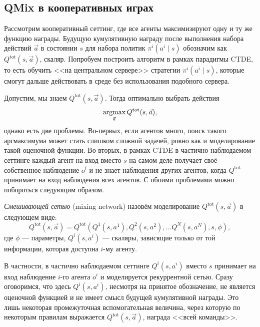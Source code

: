 \subsection{QMix в кооперативных играх}

Рассмотрим кооперативный сеттинг, где все агенты максимизируют одну и ту же функцию награды. Будущую кумулятивную награду после выполнения набора действий $\vec{a}$ в состоянии $s$ для набора политик $\pi^i(a^i \mid s)$ обозначим как $Q^{\mathrm{tot}}(s, \vec{a})$, скаляр. Попробуем построить алгоритм в рамках парадигмы CTDE, то есть обучить <<на центральном сервере>> стратегии $\pi^i(a^i \mid s)$, которые смогут дальше действовать в среде без использования подобного сервера.

Допустим, мы знаем $Q^{\mathrm{tot}}(s, \vec{a})$. Тогда оптимально выбрать действия
$$\mathop{\mathrm{argmax}}_{\vec{a}} Q^{\mathrm{tot}}(s, \vec{a}),$$
однако есть две проблемы. Во-первых, если агентов много, поиск такого аргмаксимума может стать слишком сложной задачей, ровно как и моделирование такой оценочной функции. Во-вторых, в рамках CTDE в частично наблюдаемом сеттинге каждый агент на вход вместо $s$ на самом деле получает своё собственное наблюдение $o^i$ и не знает наблюдения других агентов, когда $Q^{\mathrm{tot}}$ принимает на вход наблюдения всех агентов. С обоими проблемами можно побороться следующим образом.

\begin{definition}
\emph{Смешивающей сетью} (mixing network) назовём моделирование $Q^{\mathrm{tot}}(s, \vec{a})$ в следующем виде:
\begin{equation}\label{vdn}
Q^{\mathrm{tot}}(s, \vec{a}) = Q^{\mathrm{tot}}(Q^1(s, a^1), Q^2(s, a^2), \dots Q^N(s, a^N), s, \phi),
\end{equation}
где $\phi$ --- параметры, $Q^i(s, a^i)$ --- скаляры, зависящие только от той информации, которая доступна $i$-му агенту.
\end{definition}

В частности, в частично наблюдаемом сеттинге $Q^i(s, a^i)$ вместо $s$ принимает на вход наблюдение $i$-го агента $o^i$ и моделируется рекуррентной сетью. Сразу оговоримся, что здесь $Q^i(s, a^i)$, несмотря на принятое обозначение, не является оценочной функцией и не имеет смысл будущей кумулятивной награды. Это лишь некоторая промежуточная вспомогательная величина, через которую по некоторым правилам выражается $Q^{\mathrm{tot}}(s, \vec{a})$, награда <<всей команды>>.

